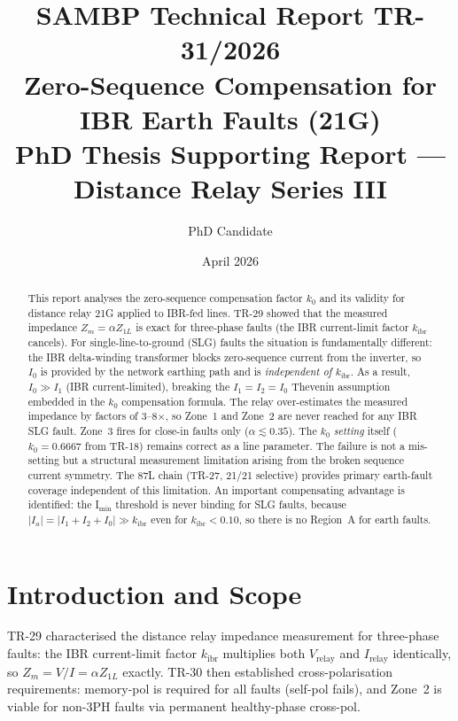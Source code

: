 \documentclass[11pt,a4paper]{article}
\title{%
  \textbf{\Large SAMBP Technical Report TR-31/2026}\\[6pt]
  \textbf{\large Zero-Sequence Compensation for IBR Earth Faults (21G)}\\[4pt]
  \normalsize PhD Thesis Supporting Report --- Distance Relay Series III
}
\author{PhD Candidate}
\date{April 2026}
\begin{document}
\maketitle\thispagestyle{fancy}

\begin{abstract}
This report analyses the zero-sequence compensation factor $k_0$ and its
validity for distance relay 21G applied to IBR-fed lines.  TR-29 showed that the
measured impedance $Z_m = \alpha Z_{1L}$ is exact for three-phase faults (the
IBR current-limit factor $k_\mathrm{ibr}$ cancels).  For single-line-to-ground
(SLG) faults the situation is fundamentally different: the IBR delta-winding
transformer blocks zero-sequence current from the inverter, so $I_0$ is provided
by the network earthing path and is \emph{independent of $k_\mathrm{ibr}$}.  As a
result, $I_0 \gg I_1$ (IBR current-limited), breaking the
$I_1 = I_2 = I_0$ Thevenin assumption embedded in the $k_0$ compensation formula.
The relay over-estimates the measured impedance by factors of 3--8$\times$, so
Zone~1 and Zone~2 are never reached for any IBR SLG fault.  Zone~3 fires for
close-in faults only ($\alpha \lesssim 0.35$).  The $k_0$ \emph{setting} itself
($k_0 = 0.6667$ from TR-18) remains correct as a line parameter.  The failure is
not a mis-setting but a structural measurement limitation arising from the broken
sequence current symmetry.  The 87L chain (TR-27, 21/21 selective) provides
primary earth-fault coverage independent of this limitation.  An important
compensating advantage is identified: the I$_\mathrm{min}$ threshold is never
binding for SLG faults, because $|I_a| = |I_1+I_2+I_0| \gg k_\mathrm{ibr}$
even for $k_\mathrm{ibr} < 0.10$, so there is no Region~A for earth faults.
\end{abstract}

\tableofcontents\newpage

\section{Introduction and Scope}
\label{sec:intro}

TR-29 characterised the distance relay impedance measurement for three-phase
faults: the IBR current-limit factor $k_\mathrm{ibr}$ multiplies both $V_\mathrm{relay}$
and $I_\mathrm{relay}$ identically, so $Z_m = V/I = \alpha Z_{1L}$ exactly.
TR-30 then established cross-polarisation requirements: memory-pol is required
for all faults (self-pol fails), and Zone~2 is viable for non-3PH faults via
permanent healthy-phase cross-pol.
\end{document}
